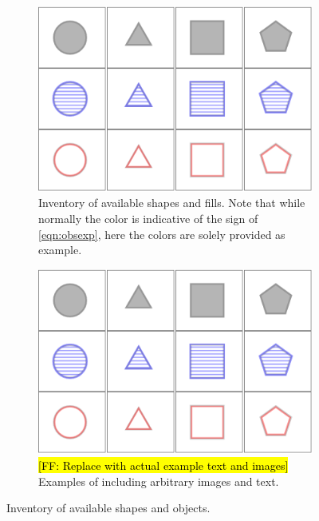 \documentclass[11pt,letterpaper]{article}
\newcommand{\Note}[1]{}
\renewcommand{\Note}[1]{\hl{[#1]}}
\newcommand{\NoteSigned}[3]{{\sethlcolor{#2}\Note{#1: #3}}}
\newcommand{\NoteFF}[1]{\NoteSigned{FF}{LightBlue}{#1}}
\begin{document}
\begin{figure}[t]
\begin{center}
\begin{subfigure}[b]{\columnwidth}
\centering
\includegraphics[scale=.5]{images/different_shapes_fills3x4.PNG}
\caption{Inventory of available shapes and fills. Note that while normally the color is indicative of the sign of \eqref{eqn:obsexp}, here the colors are solely provided as example.}
\label{fig:shape_inventory}
\end{subfigure}

\vspace{1em}
\begin{subfigure}[b]{\columnwidth}
\centering
\includegraphics[scale=.5]{images/different_shapes_fills3x4.PNG}
\caption{\NoteFF{Replace with actual example text and images} Examples of including arbitrary images and text.}
\label{fig:imgtxt_inventory}
\end{subfigure}
\caption{Inventory of available shapes and objects.}
\label{fig:inventory}
\end{center}
\end{figure}
\end{document}
